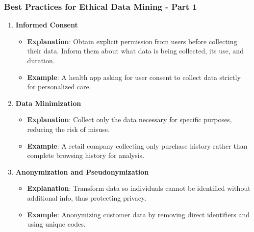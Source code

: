 \documentclass{beamer}
\begin{document}
\begin{frame}[fragile]
    \frametitle{Best Practices for Ethical Data Mining - Part 1}
    \begin{enumerate}
        \item \textbf{Informed Consent}
        \begin{itemize}
            \item \textbf{Explanation}: Obtain explicit permission from users before collecting their data. Inform them about what data is being collected, its use, and duration.
            \item \textbf{Example}: A health app asking for user consent to collect data strictly for personalized care.
        \end{itemize}
        
        \item \textbf{Data Minimization}
        \begin{itemize}
            \item \textbf{Explanation}: Collect only the data necessary for specific purposes, reducing the risk of misuse.
            \item \textbf{Example}: A retail company collecting only purchase history rather than complete browsing history for analysis.
        \end{itemize}
        
        \item \textbf{Anonymization and Pseudonymization}
        \begin{itemize}
            \item \textbf{Explanation}: Transform data so individuals cannot be identified without additional info, thus protecting privacy.
            \item \textbf{Example}: Anonymizing customer data by removing direct identifiers and using unique codes.
        \end{itemize}
    \end{enumerate}
\end{frame}
\end{document}
